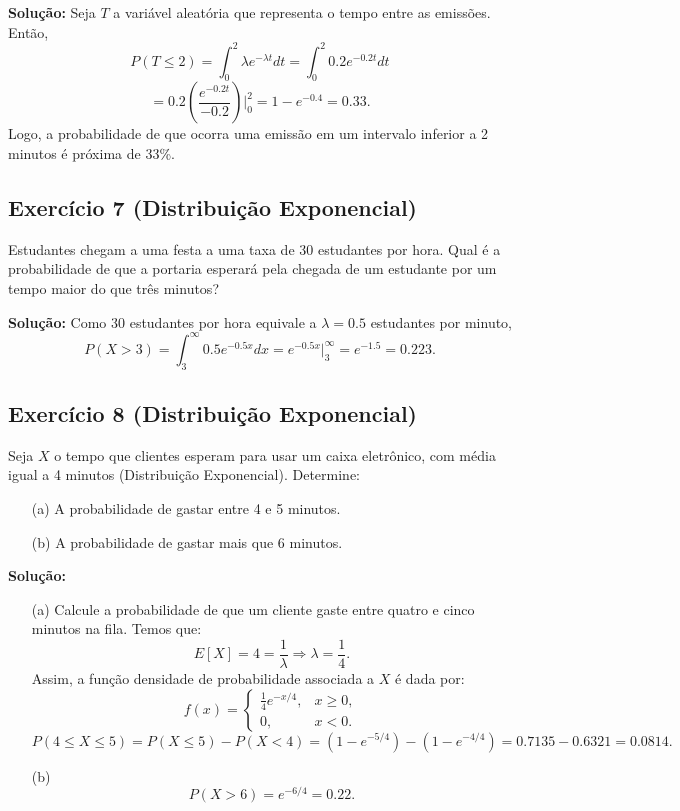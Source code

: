 \documentclass{article}
\begin{document}
\vspace{0.5cm}
\textbf{Solução:} 
Seja $T$ a variável aleatória que representa o tempo entre as emissões. Então,
    $$
    P(T \leq 2) = \int_0^2 \lambda e^{-\lambda t} dt = \int_0^2 0.2 e^{-0.2t} dt
    $$
    $$
    = 0.2 \left(\frac{e^{-0.2t}}{-0.2}\right)\bigg|_0^2 = 1 - e^{-0.4} = 0.33.
    $$
Logo, a probabilidade de que ocorra uma emissão em um intervalo inferior a 2 minutos é próxima de 33\%.

\subsection{Exercício 7 (Distribuição Exponencial)}
Estudantes chegam a uma festa a uma taxa de 30 estudantes por hora. Qual é a probabilidade de que a portaria esperará pela chegada de um estudante por um tempo maior do que três minutos?

\vspace{0.5cm}
\textbf{Solução:} Como 30 estudantes por hora equivale a $\lambda = 0.5$ estudantes por minuto,
    $$
    P(X > 3) = \int_3^\infty 0.5 e^{-0.5x} dx
    = e^{-0.5x}\biggr|_3^\infty
    = e^{-1.5}
    = 0.223.
    $$

\subsection{Exercício 8 (Distribuição Exponencial)}
Seja $X$ o tempo que clientes esperam para usar um caixa eletrônico, com média igual a 4 minutos (Distribuição Exponencial). Determine:
\begin{enumerate}
    \item[(a)] A probabilidade de gastar entre 4 e 5 minutos.
    \item[(b)] A probabilidade de gastar mais que 6 minutos.
\end{enumerate}

\vspace{0.5cm}
\textbf{Solução:}
\begin{enumerate}
    \item[(a)] Calcule a probabilidade de que um cliente gaste entre quatro e
cinco minutos na fila. Temos que:
        $$
        E[X] = 4 = \frac{1}{\lambda} \Rightarrow \lambda = \frac{1}{4}.
        $$
    Assim, a função densidade de probabilidade associada a $X$ é dada por:
        $$
        f(x) =
        \begin{cases}
        \frac{1}{4} e^{-x/4}, & x \ge 0,\\
        0, & x < 0.
        \end{cases}
        $$
        $$
        P(4 \le X \le 5) = P(X \le 5) - P(X < 4)
        = (1 - e^{-5/4}) - (1 - e^{-4/4})
        = 0.7135 - 0.6321
        = 0.0814.
        $$
    \item[(b)] 
        $$
        P(X > 6) = e^{-6/4}
        = 0.22.
        $$
\end{enumerate}
\end{document}
